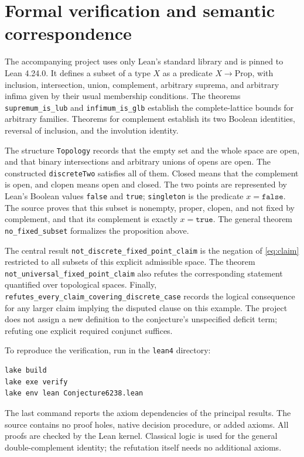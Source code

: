 \documentclass[10pt,a4paper]{article}
\newcommand{\code}[1]{\nolinkurl{#1}}
\begin{document}
\section{Formal verification and semantic correspondence}
The accompanying project uses only Lean's standard library and is pinned
to Lean 4.24.0. It defines a subset of a type $X$ as a predicate
$X\to\mathrm{Prop}$, with inclusion, intersection, union, complement,
arbitrary suprema, and arbitrary infima given by their usual membership
conditions. The theorems \code{supremum_is_lub} and
\code{infimum_is_glb} establish the complete-lattice bounds for
arbitrary families. Theorems for complement establish its two Boolean
identities, reversal of inclusion, and the involution identity.

The structure \texttt{Topology} records that the empty set and the whole
space are open, and that binary intersections and arbitrary unions of
opens are open. The constructed
\texttt{discreteTwo} satisfies all of them. Closed means that the
complement is open, and clopen means open and closed. The two points are
represented by Lean's Boolean values \texttt{false} and \texttt{true};
\texttt{singleton} is the predicate $x=\texttt{false}$.
The source proves that this subset is nonempty, proper, clopen, and not
fixed by complement, and that its complement is exactly
$x=\texttt{true}$. The general theorem \texttt{no\_fixed\_subset}
formalizes the proposition above.

The central result \code{not_discrete_fixed_point_claim}
is the negation of \eqref{eq:claim} restricted to all subsets of this
explicit admissible space. The theorem
\code{not_universal_fixed_point_claim} also refutes the
corresponding statement quantified over topological spaces. Finally,
\code{refutes_every_claim_covering_discrete_case} records the
logical consequence for any larger claim implying the disputed clause
on this example. The project does not assign a new definition to the
conjecture's unspecified deficit term; refuting one explicit required
conjunct suffices.

To reproduce the verification, run in the \texttt{lean4} directory:
\begin{verbatim}
lake build
lake exe verify
lake env lean Conjecture6238.lean
\end{verbatim}
The last command reports the axiom dependencies of the principal results.
The source contains no proof holes, native decision procedure, or added
axioms. All proofs are checked by the Lean kernel. Classical logic is
used for the general double-complement identity; the refutation itself
needs no additional axioms.
\end{document}
